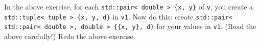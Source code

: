   In the above exercise, for each \verb!std::pair< double > {x, y}! of \verb!v!,
  you create a \verb!std::tuple< tuple > {x, y, d}! in \verb!v1!.
  Now do this: create
  \verb!std::pair< std::pair< double >, double > {{x, y}, d}! for your values in \verb!v1!.
  (Read the above carefully!)
  Redo the above exercise.
